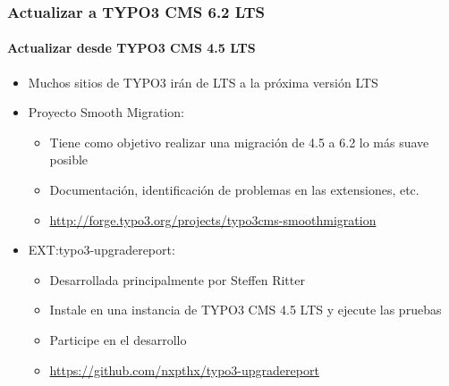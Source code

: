 
\begin{frame}[fragile]
	\frametitle{Actualizar a TYPO3 CMS 6.2 LTS}
	\framesubtitle{Actualizar desde TYPO3 CMS 4.5 LTS}

	\begin{itemize}
		\item Muchos sitios de TYPO3 irán de LTS a la próxima versión LTS
		\item Proyecto Smooth Migration:

			\begin{itemize}
				\item Tiene como objetivo realizar una migración de 4.5 a 6.2 lo más suave posible
				\item Documentación, identificación de problemas en las extensiones, etc.
				\item \smaller\url{http://forge.typo3.org/projects/typo3cms-smoothmigration}\normalsize
			\end{itemize}

		\item EXT:typo3-upgradereport:

			\begin{itemize}
				\item Desarrollada principalmente por Steffen Ritter
				\item Instale en una instancia de TYPO3 CMS 4.5 LTS y ejecute las pruebas
				\item Participe en el desarrollo
				\item \smaller\url{https://github.com/nxpthx/typo3-upgradereport}\normalsize
			\end{itemize}
	\end{itemize}

\end{frame}


